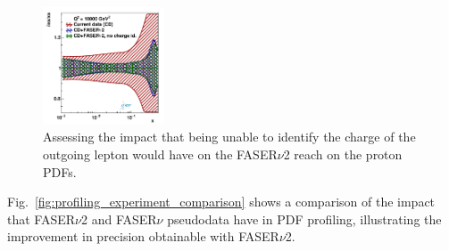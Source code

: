 \begin{figure}[t]
\includegraphics[width=0.32\textwidth]{plots/proton_fasernu2/nochargediscrimination/statOnly_FASERv2_q2_10000_pdf_s_ratio.pdf}
\caption{
Assessing the impact that being unable to identify
the charge of the outgoing lepton would have on the FASER$\nu$2 reach on the proton PDFs.
}
\label{fig:profiling_nochargediscrimination}
\end{figure}


%
Fig.~\ref{fig:profiling_experiment_comparison} shows a comparison of the impact 
that FASER$\nu$2 and FASER$\nu$ pseudodata have in PDF profiling, illustrating 
the improvement in precision obtainable with FASER$\nu$2.

